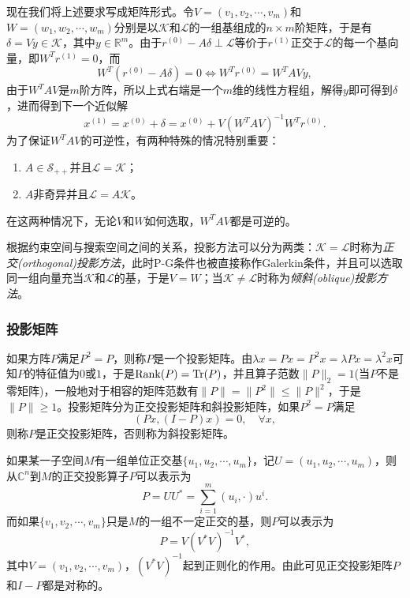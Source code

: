 \documentclass[a4paper,10pt]{ctexart}
\begin{document}
现在我们将上述要求写成矩阵形式。令$ V = (v_1, v_2,\cdots ,v_m) $和$ W = (w_1,w_2,\cdots ,w_m) $分别是以$ \mathcal{K} $和$ \mathcal{L} $的一组基组成的$ n\times m $阶矩阵，于是有$ \delta = Vy\in \mathcal{K} $，其中$ y\in \mathbb{R}^m $。由于$ r^{(0)} - A\delta\perp \mathcal{L} $等价于$ r^{(1)} $正交于$ \mathcal{L} $的每一个基向量，即$ W^Tr^{(1)} = 0 $，而
\[
    W^T (r^{(0)} - A\delta) = 0 \iff W^T r^{(0)} = W^T A V y,
\]
由于$ W^T A V $是$ m $阶方阵，所以上式右端是一个$ m $维的线性方程组，解得$ y $即可得到$ \delta $，进而得到下一个近似解
\begin{equation}\label{eq:generalprojection}
    x^{(1)} = x^{(0)} + \delta = x^{(0)} + V(W^TAV)^{-1}W^T r^{(0)}.
\end{equation}
为了保证$ W^T A V $的可逆性，有两种特殊的情况特别重要：
\begin{enumerate}
    \item $ A\in \mathcal{S}_{++} $并且$ \mathcal{L} = \mathcal{K} $；
    \item $ A $非奇异并且$ \mathcal{L} = A\mathcal{K} $。
\end{enumerate}
在这两种情况下，无论$ V $和$ W $如何选取，$ W^T A V $都是可逆的。

根据约束空间与搜索空间之间的关系，投影方法可以分为两类：$ \mathcal{K} = \mathcal{L} $时称为\emph{正交(orthogonal)投影方法}，此时P-G条件也被直接称作Galerkin条件，并且可以选取同一组向量充当$ \mathcal{K} $和$ \mathcal{L} $的基，于是$ V=W $；当$ \mathcal{K} \ne \mathcal{L} $时称为\emph{倾斜(oblique)投影方法}。

\subsubsection{投影矩阵}
如果方阵$ P $满足$ P^2 = P $，则称$ P $是一个投影矩阵。由$ \lambda x =Px = P^2 x=\lambda Px = \lambda^2 x $可知$ P $的特征值为$ 0 $或$ 1 $，于是$ {\rm Rank}(P) = {\rm Tr}(P) $，并且算子范数$ \| P \|_2 = 1 $(当$ P $不是零矩阵)，一般地对于相容的矩阵范数有$ \| P \| =\| P^2 \| \leqslant \| P \|^2 $，于是$ \| P \|\geqslant 1 $。投影矩阵分为正交投影矩阵和斜投影矩阵，如果$ P^2=P $满足
\[
    (Px,(I-P)x) = 0, \quad \forall x,
\]
则称$ P $是正交投影矩阵，否则称为斜投影矩阵。

如果某一子空间$ M $有一组单位正交基$ \{u_1,u_2,\cdots ,u_m\} $，记$ U = (u_1,u_2,\cdots ,u_m) $，则从$ \mathbb{C}^n $到$ M $的正交投影算子$ P $可以表示为
\begin{equation}
    P = UU^* = \sum_{i=1}^m (u_i, \cdot) u^i.
\end{equation}
而如果$ \{v_1, v_2,\cdots ,v_m\} $只是$ M $的一组不一定正交的基，则$ P $可以表示为
\begin{equation}
    P = V(V^*V)^{-1}V^*,
\end{equation}
其中$ V = (v_1,v_2,\cdots ,v_m) $，$ (V^*V)^{-1} $起到正则化的作用。由此可见正交投影矩阵$ P $和$ I-P $都是对称的。
\end{document}
